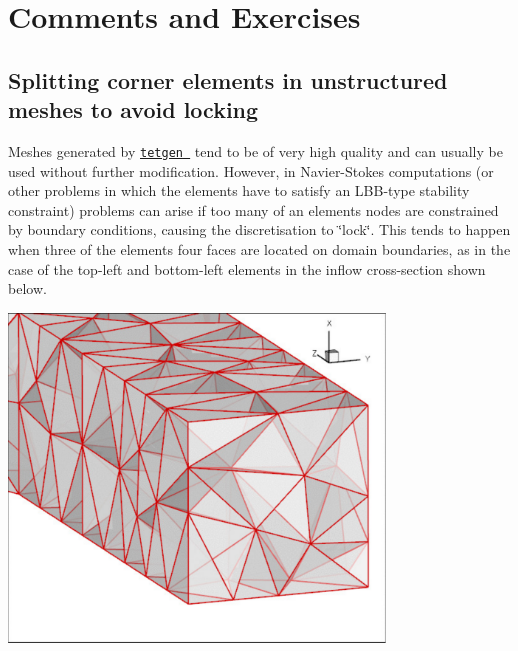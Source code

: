  

\hypertarget{index_comm_ex}{}\section{Comments and Exercises}\label{index_comm_ex}


\hypertarget{index_split}{}\subsection{Splitting corner elements in unstructured meshes to avoid locking}\label{index_split}
Meshes generated by \href{http://wias-berlin.de/software/tetgen//}{\tt {\ttfamily tetgen} } tend to be of very high quality and can usually be used without further modification. However, in Navier-\/\+Stokes computations (or other problems in which the elements have to satisfy an L\+B\+B-\/type stability constraint) problems can arise if too many of an element\textquotesingle{}s nodes are constrained by boundary conditions, causing the discretisation to \char`\"{}lock\char`\"{}. This tends to happen when three of the element\textquotesingle{}s four faces are located on domain boundaries, as in the case of the top-\/left and bottom-\/left elements in the inflow cross-\/section shown below.

 
\begin{DoxyImage}
\includegraphics[width=0.75\textwidth]{mesh_without_split}
\end{DoxyImage}


